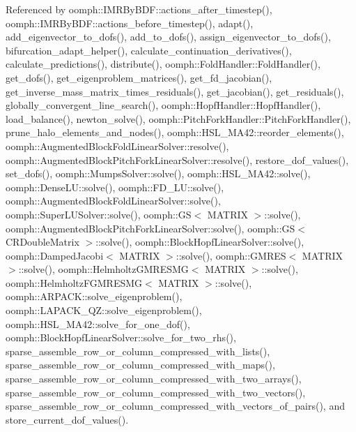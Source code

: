 Referenced by oomph\+::\+I\+M\+R\+By\+B\+D\+F\+::actions\+\_\+after\+\_\+timestep(), oomph\+::\+I\+M\+R\+By\+B\+D\+F\+::actions\+\_\+before\+\_\+timestep(), adapt(), add\+\_\+eigenvector\+\_\+to\+\_\+dofs(), add\+\_\+to\+\_\+dofs(), assign\+\_\+eigenvector\+\_\+to\+\_\+dofs(), bifurcation\+\_\+adapt\+\_\+helper(), calculate\+\_\+continuation\+\_\+derivatives(), calculate\+\_\+predictions(), distribute(), oomph\+::\+Fold\+Handler\+::\+Fold\+Handler(), get\+\_\+dofs(), get\+\_\+eigenproblem\+\_\+matrices(), get\+\_\+fd\+\_\+jacobian(), get\+\_\+inverse\+\_\+mass\+\_\+matrix\+\_\+times\+\_\+residuals(), get\+\_\+jacobian(), get\+\_\+residuals(), globally\+\_\+convergent\+\_\+line\+\_\+search(), oomph\+::\+Hopf\+Handler\+::\+Hopf\+Handler(), load\+\_\+balance(), newton\+\_\+solve(), oomph\+::\+Pitch\+Fork\+Handler\+::\+Pitch\+Fork\+Handler(), prune\+\_\+halo\+\_\+elements\+\_\+and\+\_\+nodes(), oomph\+::\+H\+S\+L\+\_\+\+M\+A42\+::reorder\+\_\+elements(), oomph\+::\+Augmented\+Block\+Fold\+Linear\+Solver\+::resolve(), oomph\+::\+Augmented\+Block\+Pitch\+Fork\+Linear\+Solver\+::resolve(), restore\+\_\+dof\+\_\+values(), set\+\_\+dofs(), oomph\+::\+Mumps\+Solver\+::solve(), oomph\+::\+H\+S\+L\+\_\+\+M\+A42\+::solve(), oomph\+::\+Dense\+L\+U\+::solve(), oomph\+::\+F\+D\+\_\+\+L\+U\+::solve(), oomph\+::\+Augmented\+Block\+Fold\+Linear\+Solver\+::solve(), oomph\+::\+Super\+L\+U\+Solver\+::solve(), oomph\+::\+G\+S$<$ M\+A\+T\+R\+I\+X $>$\+::solve(), oomph\+::\+Augmented\+Block\+Pitch\+Fork\+Linear\+Solver\+::solve(), oomph\+::\+G\+S$<$ C\+R\+Double\+Matrix $>$\+::solve(), oomph\+::\+Block\+Hopf\+Linear\+Solver\+::solve(), oomph\+::\+Damped\+Jacobi$<$ M\+A\+T\+R\+I\+X $>$\+::solve(), oomph\+::\+G\+M\+R\+E\+S$<$ M\+A\+T\+R\+I\+X $>$\+::solve(), oomph\+::\+Helmholtz\+G\+M\+R\+E\+S\+M\+G$<$ M\+A\+T\+R\+I\+X $>$\+::solve(), oomph\+::\+Helmholtz\+F\+G\+M\+R\+E\+S\+M\+G$<$ M\+A\+T\+R\+I\+X $>$\+::solve(), oomph\+::\+A\+R\+P\+A\+C\+K\+::solve\+\_\+eigenproblem(), oomph\+::\+L\+A\+P\+A\+C\+K\+\_\+\+Q\+Z\+::solve\+\_\+eigenproblem(), oomph\+::\+H\+S\+L\+\_\+\+M\+A42\+::solve\+\_\+for\+\_\+one\+\_\+dof(), oomph\+::\+Block\+Hopf\+Linear\+Solver\+::solve\+\_\+for\+\_\+two\+\_\+rhs(), sparse\+\_\+assemble\+\_\+row\+\_\+or\+\_\+column\+\_\+compressed\+\_\+with\+\_\+lists(), sparse\+\_\+assemble\+\_\+row\+\_\+or\+\_\+column\+\_\+compressed\+\_\+with\+\_\+maps(), sparse\+\_\+assemble\+\_\+row\+\_\+or\+\_\+column\+\_\+compressed\+\_\+with\+\_\+two\+\_\+arrays(), sparse\+\_\+assemble\+\_\+row\+\_\+or\+\_\+column\+\_\+compressed\+\_\+with\+\_\+two\+\_\+vectors(), sparse\+\_\+assemble\+\_\+row\+\_\+or\+\_\+column\+\_\+compressed\+\_\+with\+\_\+vectors\+\_\+of\+\_\+pairs(), and store\+\_\+current\+\_\+dof\+\_\+values().

